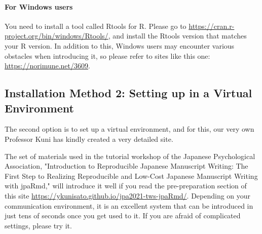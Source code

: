 \documentclass{ltjsbook}
\begin{document}
\paragraph*{For Windows users} You need to install a tool called Rtools for R. Please go to \url{https://cran.r-project.org/bin/windows/Rtools/}, and install the Rtools version that matches your R version.
In addition to this, Windows users may encounter various obstacles when introducing it, so please refer to sites like this one: \url{https://norimune.net/3609}.

\subsection{Installation Method 2: Setting up in a Virtual Environment}

The second option is to set up a virtual environment, and for this, our very own Professor Kuni has kindly created a very detailed site.

The set of materials used in the tutorial workshop of the Japanese Psychological Association, "Introduction to Reproducible Japanese Manuscript Writing: The First Step to Realizing Reproducible and Low-Cost Japanese Manuscript Writing with jpaRmd," will introduce it well if you read the pre-preparation section of this site \url{https://ykunisato.github.io/jpa2021-tws-jpaRmd/}. Depending on your communication environment, it is an excellent system that can be introduced in just tens of seconds once you get used to it. If you are afraid of complicated settings, please try it.
\end{document}
